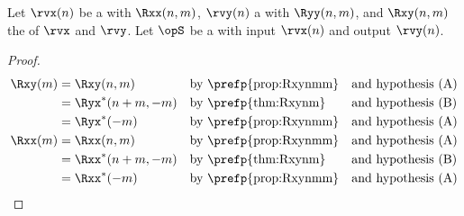 \begin{corollary}
\label{cor:Rxxm}
\label{cor:Rxym}
Let $\rvx(n)$ be a  with  $\Rxx(n,m)$,
    $\rvy(n)$    a  with  $\Ryy(n,m)$,
and $\Rxy(n,m)$  the  of $\rvx$ and $\rvy$.
Let $\opS$ be a  with input $\rvx(n)$ and output $\rvy(n)$.
\end{corollary}
\begin{proof}
\begin{align*}
  \Rxy(m)
     &= \Rxy(n,m)
     && \text{by \prefp{prop:Rxynmm}}
     && \text{and hypothesis (A)}
   \\&= \Ryx^\ast(n+m,-m)
     && \text{by \prefp{thm:Rxynm}}
     && \text{and hypothesis (B)}
   \\&= \Ryx^\ast(-m)
     && \text{by \prefp{prop:Rxynmm}}
     && \text{and hypothesis (A)}
   \\
  \Rxx(m)
     &= \Rxx(n,m)
     && \text{by \prefp{prop:Rxynmm}}
     && \text{and hypothesis (A)}
   \\&= \Rxx^\ast(n+m,-m)
     && \text{by \prefp{thm:Rxynm}}
     && \text{and hypothesis (B)}
   \\&= \Rxx^\ast(-m)
     && \text{by \prefp{prop:Rxynmm}}
     && \text{and hypothesis (A)}
\end{align*}
\end{proof}



